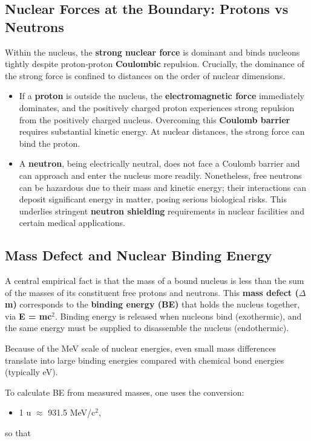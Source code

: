\documentclass[11pt,a4paper]{article}
\let\originalsubsection\subsection
\renewcommand{\subsection}{\Needspace{8\baselineskip}\originalsubsection}
\begin{document}
\subsection{Nuclear Forces at the Boundary: Protons vs Neutrons}
Within the nucleus, the \textbf{strong nuclear force} is dominant and binds nucleons tightly despite proton-proton \textbf{Coulombic} repulsion. Crucially, the dominance of the strong force is confined to distances on the order of nuclear dimensions.

\begin{itemize}
\item If a \textbf{proton} is outside the nucleus, the \textbf{electromagnetic force} immediately dominates, and the positively charged proton experiences strong repulsion from the positively charged nucleus. Overcoming this \textbf{Coulomb barrier} requires substantial kinetic energy. At nuclear distances, the strong force can bind the proton.
\item A \textbf{neutron}, being electrically neutral, does not face a Coulomb barrier and can approach and enter the nucleus more readily. Nonetheless, free neutrons can be hazardous due to their mass and kinetic energy; their interactions can deposit significant energy in matter, posing serious biological risks. This underlies stringent \textbf{neutron shielding} requirements in nuclear facilities and certain medical applications.
\end{itemize}
\subsection{Mass Defect and Nuclear Binding Energy}
A central empirical fact is that the mass of a bound nucleus is less than the sum of the masses of its constituent free protons and neutrons. This \textbf{mass defect (\ensuremath{\Delta}m)} corresponds to the \textbf{binding energy (BE)} that holds the nucleus together, via \textbf{E = mc\ensuremath{{}^{2}}}. Binding energy is released when nucleons bind (exothermic), and the same energy must be supplied to disassemble the nucleus (endothermic).

Because of the MeV scale of nuclear energies, even small mass differences translate into large binding energies compared with chemical bond energies (typically eV).

To calculate BE from measured masses, one uses the conversion:

\begin{itemize}
\item 1 u \ensuremath{\approx} 931.5 MeV/c\ensuremath{{}^{2}},
\end{itemize}
so that
\end{document}
